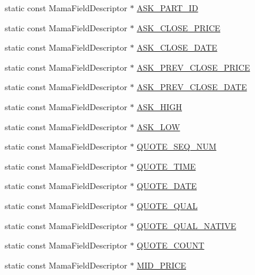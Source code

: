 \begin{CompactItemize}
\item 
static const Mama\-Field\-Descriptor $\ast$ \hyperlink{classWombat_1_1MamdaQuoteFields_7d6aea65c597204460ca4c158332f7fb}{ASK\_\-PART\_\-ID}
\item 
static const Mama\-Field\-Descriptor $\ast$ \hyperlink{classWombat_1_1MamdaQuoteFields_7817ffb7cc7b4fe6ffa68e4fd60c8527}{ASK\_\-CLOSE\_\-PRICE}
\item 
static const Mama\-Field\-Descriptor $\ast$ \hyperlink{classWombat_1_1MamdaQuoteFields_6db589d14293d3c51eaf29bd33d9003b}{ASK\_\-CLOSE\_\-DATE}
\item 
static const Mama\-Field\-Descriptor $\ast$ \hyperlink{classWombat_1_1MamdaQuoteFields_45e4292ad349bf82196b4a07ed6d04c7}{ASK\_\-PREV\_\-CLOSE\_\-PRICE}
\item 
static const Mama\-Field\-Descriptor $\ast$ \hyperlink{classWombat_1_1MamdaQuoteFields_2a0a10e1c834fd5aedca9393b98590a6}{ASK\_\-PREV\_\-CLOSE\_\-DATE}
\item 
static const Mama\-Field\-Descriptor $\ast$ \hyperlink{classWombat_1_1MamdaQuoteFields_a392069e32d21db1e30df8795568fd7f}{ASK\_\-HIGH}
\item 
static const Mama\-Field\-Descriptor $\ast$ \hyperlink{classWombat_1_1MamdaQuoteFields_e4eb28bbb14be219e2e9867a1d9328a6}{ASK\_\-LOW}
\item 
static const Mama\-Field\-Descriptor $\ast$ \hyperlink{classWombat_1_1MamdaQuoteFields_85771f7bd32540f9e9dd67b7bdc72bbd}{QUOTE\_\-SEQ\_\-NUM}
\item 
static const Mama\-Field\-Descriptor $\ast$ \hyperlink{classWombat_1_1MamdaQuoteFields_e2dfdab09213386739fbb67f4fc68949}{QUOTE\_\-TIME}
\item 
static const Mama\-Field\-Descriptor $\ast$ \hyperlink{classWombat_1_1MamdaQuoteFields_ed0c8a8e450c6283d410e5d303b40db1}{QUOTE\_\-DATE}
\item 
static const Mama\-Field\-Descriptor $\ast$ \hyperlink{classWombat_1_1MamdaQuoteFields_ec2ce6eaece7663786d99fe093b9e413}{QUOTE\_\-QUAL}
\item 
static const Mama\-Field\-Descriptor $\ast$ \hyperlink{classWombat_1_1MamdaQuoteFields_240035fe06f60d8cf7af26c229b848f0}{QUOTE\_\-QUAL\_\-NATIVE}
\item 
static const Mama\-Field\-Descriptor $\ast$ \hyperlink{classWombat_1_1MamdaQuoteFields_2175c0229010fdac0fe691cd1a09093e}{QUOTE\_\-COUNT}
\item 
static const Mama\-Field\-Descriptor $\ast$ \hyperlink{classWombat_1_1MamdaQuoteFields_0e5e0283a7307712f205db3808376640}{MID\_\-PRICE}

\end{CompactItemize}
